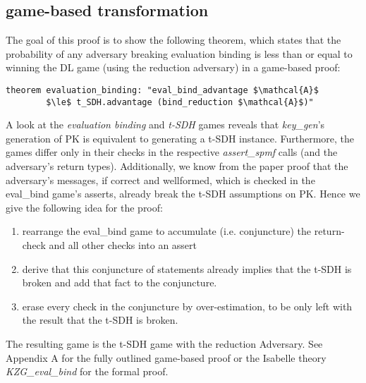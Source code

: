 \subsection{game-based transformation}
The goal of this proof is to show the following theorem, which states that the probability of any adversary breaking evaluation binding is less than or equal to winning the DL game (using the reduction adversary) in a game-based proof:
\begin{lstlisting}[language=isabelle]
    theorem evaluation_binding: "eval_bind_advantage $\mathcal{A}$ 
        $\le$ t_SDH.advantage (bind_reduction $\mathcal{A}$)"
\end{lstlisting}

A look at the \textit{evaluation binding} and \textit{t-SDH} games reveals that \textit{key\_gen}'s generation of PK is equivalent to generating a t-SDH instance. Furthermore, the games differ only in their checks in the respective \textit{assert\_spmf} calls (and the adversary's return types).  
Additionally, we know from the paper proof that the adversary's messages, if correct and wellformed, which is checked in the eval\_bind game's asserts, already break the t-SDH assumptions on PK. 
Hence we give the following idea for the proof:
\begin{enumerate}
    \item rearrange the eval\_bind game to accumulate (i.e. conjuncture) the return-check and all other checks into an assert
    \item derive that this conjuncture of statements already implies that the t-SDH is broken and add that fact to the conjuncture.
    \item erase every check in the conjuncture by over-estimation, to be only left with the result that the t-SDH is broken.
\end{enumerate}
The resulting game is the t-SDH game with the reduction Adversary. 
See Appendix A for the fully outlined game-based proof or the Isabelle theory \textit{KZG\_eval\_bind} for the formal proof.

